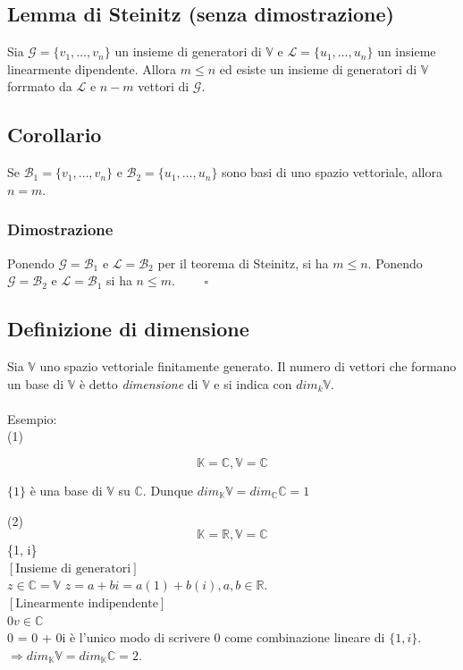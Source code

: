 \documentclass[12pt]{article}
\begin{document}
\subsection{Lemma di Steinitz (senza dimostrazione)}

Sia $\mathcal{G} = \{v_1, \dots, v_n\}$ un insieme di generatori di $\mathbb{V}$ e $\mathcal{L} = \{u_1, \dots, u_n\}$ un insieme linearmente dipendente. Allora
$m \le n$ ed esiste un insieme di generatori di $\mathbb{V}$ forrmato da $\mathcal{L}$ e $n-m$ vettori di $\mathcal{G}$.

\subsection{Corollario}

Se $\mathcal{B}_1 = \{v_1, \dots, v_n\}$ e $\mathcal{B}_2 = \{u_1, \dots, u_n\}$ sono basi di uno spazio vettoriale, allora $n = m$.

\subsubsection{Dimostrazione}

Ponendo $\mathcal{G} = \mathcal{B}_1$ e $\mathcal{L} = \mathcal{B}_2$ per il teorema di Steinitz, si ha $m \le n$. Ponendo $\mathcal{G} = \mathcal{B}_2$ e $\mathcal{L} = \mathcal{B}_1$  si ha $n \le m$. $\quad \quad \square$

\subsection{Definizione di dimensione}

Sia $\mathbb{V}$ uno spazio vettoriale finitamente generato. Il numero di vettori che formano un base di $\mathbb{V}$ è detto \textit{dimensione} di $\mathbb{V}$ e si indica con $dim_k\mathbb{V}$.
\\\\
Esempio: \\
(1)

\[\mathbb{K} = \mathbb{C}, \mathbb{V} = \mathbb{C}\]
\begin{center}
$\{1\}$ è una base di $\mathbb{V}$ su $\mathbb{C}$.
Dunque $dim_{\mathbb{K}}\mathbb{V} = dim_{\mathbb{C}}\mathbb{C} = 1$
\end{center}
(2)
\[\mathbb{K} = \mathbb{R}, \mathbb{V} = \mathbb{C}\]
\{1, i\} 
\\
$[\text{Insieme di generatori}]$ \\
$z \in \mathbb{C} = \mathbb{V}$
$z = a + bi = a(1) + b(i), a, b \in \mathbb{R}$.\\
$[\text{Linearmente indipendente}]$ \\
$0v \in \mathbb{C}$\\
0 = 0 + 0i è l'unico modo di scrivere 0 come combinazione lineare di $\{1, i\}$.
$\Longrightarrow dim_{\mathbb{K}}\mathbb{V} = dim_{\mathbb{K}}\mathbb{C} = 2$.
\end{document}
